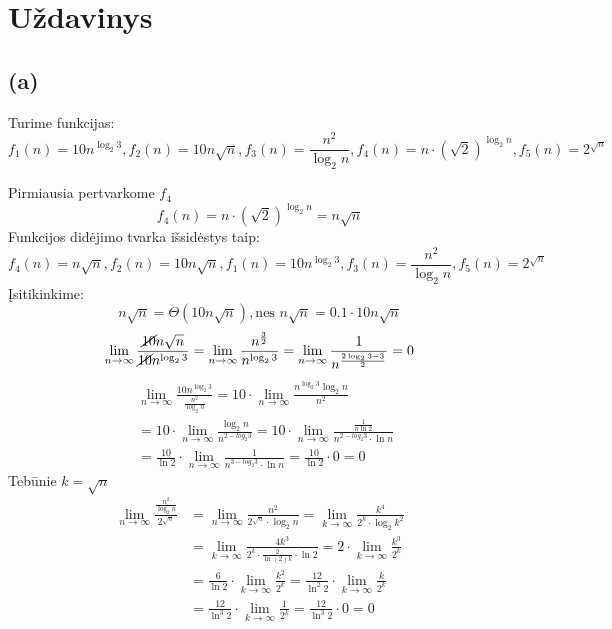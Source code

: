 \documentclass[a4paper,lithuanian]{article}
\begin{document}
\section{Uždavinys}
\subsection*{(a)}
Turime funkcijas:
\[f_1(n)=10n^{\log_2{3}},f_2(n)=10n\sqrt{n},f_3(n)=\frac{n^2}{\log_2{n}},f_4(n)=n\cdot{}(\sqrt{2})^{\log_2{n}},f_5(n)=2^{\sqrt{n}}\]

Pirmiausia pertvarkome $f_4$
\[f_4(n)=n\cdot{}(\sqrt{2})^{\log_2{n}}=n\sqrt{n}\]
Funkcijos didėjimo tvarka išsidėstys taip:
\[f_4(n)=n\sqrt{n},f_2(n)=10n\sqrt{n},f_1(n)=10n^{\log_2{3}},f_3(n)=\frac{n^2}{\log_2{n}},f_5(n)=2^{\sqrt{n}}\]
Įsitikinkime:\\
\begin{equation}
  n\sqrt{n}=\Theta{(10n\sqrt{n})}, \text{nes }n\sqrt{n}=0.1 \cdot{}10n\sqrt{n}
\end{equation}
\begin{equation}
  \lim_{n\rightarrow\infty{}}\frac{\cancel{10}n\sqrt{n}}{\cancel{10}n^{\log_2{3}}}
 =\lim_{n\rightarrow\infty{}}\frac{n^{\frac{3}{2}}}{n^{\log_2{3}}}
 =\lim_{n\rightarrow\infty{}}\frac{1}{n^{\frac{2\log_2{3}-3}{2}}}
 =0
\end{equation}
\begin{equation}
  \begin{aligned}
    &\lim_{n\rightarrow\infty{}}\frac{10n^{\log_2{3}}}{\frac{n^2}{\log_2{n}}} =10\cdot{}\lim_{n\rightarrow\infty{}}\frac{n^{\log_2{3}}\log_2{n}}{n^2}\\
    &=10\cdot{}\lim_{n\rightarrow\infty{}}\frac{\log_2{n}}{n^{2-log_2{3}}}
    =10\cdot{}\lim_{n\rightarrow\infty{}}\frac{\frac{1}{n \ln{2}}}{n^{2-log_2{3}}\cdot{}\ln{n}}\\
    &=\frac{10}{\ln{2}}\cdot{}\lim_{n\rightarrow\infty{}}\frac{1}{n^{3-log_2{3}}\cdot{}\ln{n}}
    =\frac{10}{\ln{2}}\cdot{}0=0
  \end{aligned}
\end{equation}
Tebūnie $k = \sqrt{n}$
\begin{equation}
  \begin{aligned}
  \lim_{n\rightarrow\infty{}}\frac{\frac{n^2}{\log_2{n}}}{2^\sqrt{n}}
  &=\lim_{n\rightarrow\infty{}}\frac{n^2}{2^{\sqrt{n}}\cdot{}\log_2{n}}
  =\lim_{k\rightarrow\infty{}}\frac{k^4}{2^{k}\cdot{}\log_2{k^2}}\\
  &=\lim_{k\rightarrow\infty{}}\frac{4k^3}{2^{k}\cdot{}\frac{2}{\ln{(2)}k}\cdot{}\ln{2}}
  =2\cdot{}\lim_{k\rightarrow\infty{}}\frac{k^3}{2^{k}}\\
  &=\frac{6}{\ln{2}}\cdot{}\lim_{k\rightarrow\infty{}}\frac{k^2}{2^{k}}
  =\frac{12}{\ln^{2}{2}}\cdot{}\lim_{k\rightarrow\infty{}}\frac{k}{2^{k}}\\
  &=\frac{12}{\ln^{3}{2}}\cdot{}\lim_{k\rightarrow\infty{}}\frac{1}{2^{k}}
  =\frac{12}{\ln^{3}{2}}\cdot{}0=0
  \end{aligned}
\end{equation}
\end{document}
